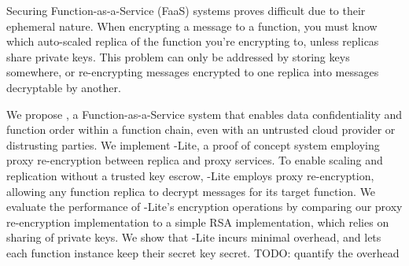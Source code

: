 



Securing Function-as-a-Service (FaaS) systems proves difficult due to their ephemeral nature.
%
When encrypting a message to a function, you must know which auto-scaled replica of the function you're encrypting to, unless replicas share private keys.
%
This problem can only be addressed by storing keys somewhere, or re-encrypting messages encrypted to one replica into messages decryptable by another.

%
We propose \SystemName, a Function-as-a-Service system that enables data
confidentiality and function order within a function chain, even with an
untrusted cloud provider or distrusting parties.
%
%
We implement \SystemName-Lite, a proof of concept system employing proxy re-encryption between replica and proxy services.
To enable scaling and replication without a trusted key escrow, \SystemName-Lite employs
proxy re-encryption, allowing any function replica to decrypt messages for its
target function.
%
We evaluate the performance of \SystemName-Lite's encryption operations by comparing our proxy re-encryption implementation to a simple RSA implementation, which relies on sharing of private keys.
%
We show that \SystemName-Lite incurs minimal overhead, and lets each function instance keep their secret key secret.
\color{red} TODO: quantify the overhead \color{black}

